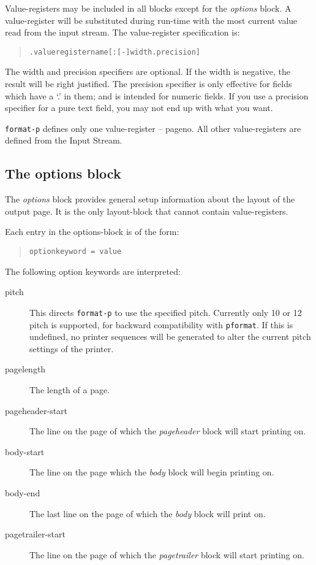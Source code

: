 \documentclass[a4paper,twoside]{article}
\begin{document}
Value-registers may be included in all blocks except for the \emph{options}
block.  A value-register will be substituted during run-time with the most
current value read from the input stream. The value-register
specification is:

	\begin{quote}
		\texttt{.valueregistername[:[-]width.precision]}
	\end{quote}

The width and precision specifiers are optional. If the width is
negative, the result will be right justified. The precision specifier
is only effective for fields which have a `.' in them; and is intended
for numeric fields. If you use a
precision specifier for a pure text field, you may not end up with
what you want.

\texttt{format-p} defines only one value-register -- \textsf{pageno}. All other
value-registers are defined from the Input Stream.

\subsection{The options block}

	The \emph{options} block provides general setup information about the
	layout of the output page. It is the only layout-block that cannot
	contain value-registers.

	Each entry in the options-block is of the form:

	\begin{quote}
		\texttt{optionkeyword = value}
	\end{quote}

	The following option keywords are interpreted:

		\begin{description}

			\item[pitch]
				This directs \texttt{format-p} to use the specified pitch.
				Currently only 10 or 12 pitch is supported, for backward
				compatibility with \texttt{pformat}. If this is
				undefined, no printer sequences
				will be generated to alter the current pitch settings
				of the printer.

			\item[pagelength]
				The length of a page.

			\item[pageheader-start]
				The line on the page of which the \emph{pageheader} block
				will start printing on.

			\item[body-start]
				The line on the page which the \emph{body} block will
				begin printing on.

			\item[body-end]
				The last line on the page of which the \emph{body}
				block will print on.

			\item[pagetrailer-start]
				The line on the page of which the \emph{pagetrailer} block
				will start printing on.

		\end{description}
\end{document}
